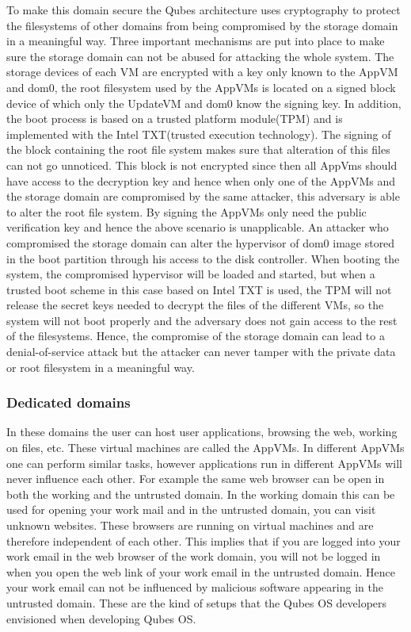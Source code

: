 \documentclass[runningheads,a4paper]{article}
\begin{document}
To make this domain secure the Qubes architecture uses cryptography to
protect the filesystems of other domains from being compromised by the
storage domain in a meaningful way. Three important mechanisms are put
into place to make sure the storage domain can not be abused for
attacking the whole system. The storage devices of each VM are
encrypted with a key only known to the AppVM and dom0, the root
filesystem used by the AppVMs is located on a signed block device of
which only the UpdateVM and dom0 know the signing key. In addition, the boot
process is based on a trusted platform module(TPM) and is implemented
with the Intel TXT(trusted execution technology). The signing of the
block containing the root file system makes sure that alteration of
this files can not go unnoticed. This block is not encrypted since
then all AppVms should have access to the decryption key and hence
when only one of the AppVMs and the storage domain are compromised by
the same attacker, this adversary is able to alter the root file
system. By signing the AppVMs only need the public verification key
and hence the above scenario is unapplicable. An attacker who
compromised the storage domain can alter the hypervisor of dom0 image
stored in the boot partition through his access to the disk
controller. When booting the system, the compromised hypervisor will be
loaded and started, but when a trusted boot scheme in this case based
on Intel TXT is used, the TPM will not release the secret keys needed
to decrypt the files of the different VMs, so the system will not boot
properly and the adversary does not gain access to the rest of the
filesystems. Hence, the compromise of the storage domain can lead to a
denial-of-service attack but the attacker can never tamper with the
private data or root filesystem in a meaningful way.

\subsubsection{Dedicated domains}

In these domains the user can host user applications, browsing the
web, working on files, etc. These virtual machines are called the
AppVMs. In different AppVMs one can perform similar tasks, however
applications run in different AppVMs will never influence each other. 
For example the same web browser can be
open in both the working and the untrusted domain. In the working
domain this can be used for opening your work mail and in the
untrusted domain, you can visit unknown websites. These browsers are
running on virtual machines and are therefore independent of each
other. This implies that if you are logged into your work email in
the web browser of the work domain, you will not be logged in when you
open the web link of your work email in the untrusted domain. Hence
your work email can not be influenced by malicious software appearing
in the untrusted domain. These are the kind of setups that the Qubes
OS developers envisioned when developing Qubes OS.
\end{document}
